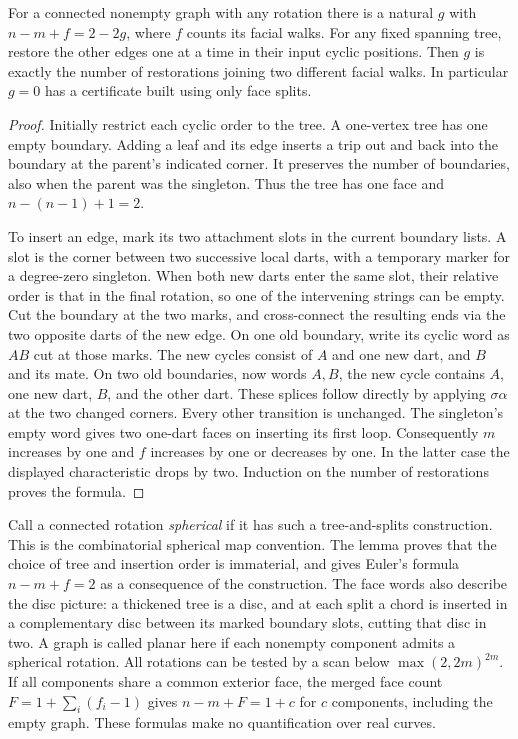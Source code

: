 \begin{lemma}\leavevmode\label{lem:sphere}
For a connected nonempty graph with any rotation there is a natural $g$ with
$n-m+f=2-2g$, where $f$ counts its facial walks. For any fixed spanning tree,
restore the other edges one at a time in their input cyclic positions.
Then $g$ is exactly the number of restorations joining two different facial
walks. In particular $g=0$ has a certificate built using only face splits.
\end{lemma}
\begin{proof}
Initially restrict each cyclic order to the tree. A one-vertex tree has one
empty boundary. Adding a leaf and its edge inserts a trip out and back into
the boundary at the parent's indicated corner. It preserves the number of
boundaries, also when the parent was the singleton. Thus the tree has one
face and $n-(n-1)+1=2$.

To insert an edge, mark its two attachment slots in the current boundary
lists. A slot is the corner between two successive local darts, with a
temporary marker for a degree-zero singleton. When both new darts enter
the same slot, their relative order is that in the final rotation, so one
of the intervening strings can be empty. Cut the boundary at the two marks,
and cross-connect the resulting ends via the two opposite darts of the
new edge. On one old boundary, write its cyclic word as $AB$ cut at those
marks. The new cycles consist of $A$ and one new dart, and $B$ and its
mate. On two old boundaries, now words $A,B$, the new cycle contains
$A$, one new dart, $B$, and the other dart. These splices follow directly
by applying $\sigma\alpha$ at the two changed corners. Every other transition
is unchanged. The singleton's empty word gives two one-dart faces on
inserting its first loop. Consequently $m$ increases by one and $f$ increases
by one or decreases by one. In the latter case the displayed characteristic
drops by two. Induction on the number of restorations proves the formula.
\end{proof}
Call a connected rotation \emph{spherical} if it has such a tree-and-splits
construction. This is the combinatorial spherical map convention. The lemma
proves that the choice of tree and insertion order is immaterial, and gives
Euler's formula $n-m+f=2$ as a consequence of the construction. The face
words also describe the disc picture: a thickened tree is a disc, and at
each split a chord is inserted in a complementary disc between its marked
boundary slots, cutting that disc in two. A graph is called planar here if
each nonempty component admits a spherical rotation. All rotations can be
tested by a scan below $\max(2,2m)^{2m}$. If all components share a common
exterior face, the merged face count $F=1+\sum_i(f_i-1)$ gives
$n-m+F=1+c$ for $c$ components, including the empty graph. These formulas
make no quantification over real curves.

